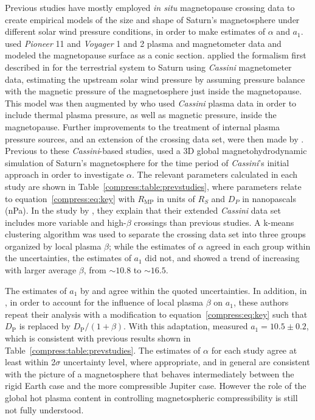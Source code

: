 Previous studies have mostly employed \textit{in situ} magnetopause crossing data to create empirical models of the size and shape of Saturn's magnetosphere under different solar wind pressure conditions, in order to make estimates of $\alpha$ and $a_1$. \citet{slavin1985} used \textit{Pioneer} 11 and \textit{Voyager} 1 and 2 plasma and magnetometer data and modeled the magnetopause surface as a conic section. \citet{arridge2006} applied the formalism first described in \citet{shue1997} for the terrestrial system to Saturn using \textit{Cassini} magnetometer data, estimating the upstream solar wind pressure by assuming pressure balance with the magnetic pressure of the magnetosphere just inside the magnetopause. This model was then augmented by \citet{kanani2010} who used \textit{Cassini} plasma data in order to include thermal plasma pressure, as well as magnetic pressure, inside the magnetopause. Further improvements to the treatment of internal plasma pressure sources, and an extension of the crossing data set, were then made by \citet{pilkington2015}. Previous to these \textit{Cassini}-based studies, \citet{hansen2005} used a 3D global magnetohydrodynamic simulation of Saturn's magnetosphere for the time period of \textit{Cassini}'s initial approach in order to investigate $\alpha$. The relevant parameters calculated in each study are shown in Table~\ref{compress:table:prevstudies}, where parameters relate to equation~\ref{compress:eq:key} with $R_\mathrm{MP}$ in units of $\si{R_S}$ and $D_{P}$ in nanopascals (\si{nPa}). In the study by \citet{pilkington2015}, they explain that their extended \textit{Cassini} data set includes more variable and high-$\beta$ crossings than previous studies. A k-means clustering algorithm was used to separate the crossing data set into three groups organized by local plasma $\beta$; while the estimates of $\alpha$ agreed in each group within the uncertainties, the estimates of $a_1$ did not, and showed a trend of increasing with larger average $\beta$, from ${\sim}10.8$ to ${\sim}16.5$.

The estimates of $a_1$ by \citet{arridge2006} and \citet{kanani2010} agree within the quoted uncertainties. In addition, in \citet{pilkington2015}, in order to account for the influence of local plasma $\beta$ on $a_1$, these authors repeat their analysis with a modification to equation~\ref{compress:eq:key} such that $D_\mathrm{P}$ is replaced by $D_\mathrm{P}/(1+\beta)$. With this adaptation, \citet{pilkington2015} measured $a_1 = 10.5 \pm 0.2$, which is consistent with previous results shown in Table~\ref{compress:table:prevstudies}. The estimates of $\alpha$ for each study agree at least within 2$\sigma$ uncertainty level, where appropriate, and in general are consistent with the picture of a magnetosphere that behaves intermediately between the rigid Earth case and the more compressible Jupiter case. However the role of the global hot plasma content in controlling magnetospheric compressibility is still not fully understood.

